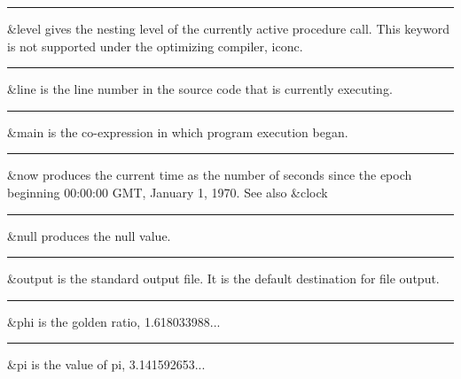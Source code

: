\bigskip\hrule\vspace{0.1cm}

\noindent
{}\textsf{\&level} gives the nesting level of the
currently active procedure call. This keyword is not supported under
the optimizing compiler, iconc.

\bigskip\hrule\vspace{0.1cm}

\noindent
{}\textsf{\&line} is the line number in the
source code that is currently executing.

\bigskip\hrule\vspace{0.1cm}

\noindent
{}\textsf{\&main} is the co-expression in which program
execution began.

\bigskip\hrule\vspace{0.1cm}

\noindent
\textsf{\&}\textsf{now} produces the current time as the
number of seconds since the epoch beginning 00:00:00 GMT, January 1,
1970. See also \&clock

\bigskip\hrule\vspace{0.1cm}

\noindent
{}\textsf{\&null} produces the null value.

\bigskip\hrule\vspace{0.1cm}

\noindent
{}\textsf{\&output} is the standard
output file. It is the default destination for file output.

\bigskip\hrule\vspace{0.1cm}

\noindent
{}\textsf{\&phi}
is the golden ratio, 1.618033988...

\bigskip\hrule\vspace{0.1cm}

\noindent
{}\textsf{\&pi} is the value of pi, 3.141592653...

